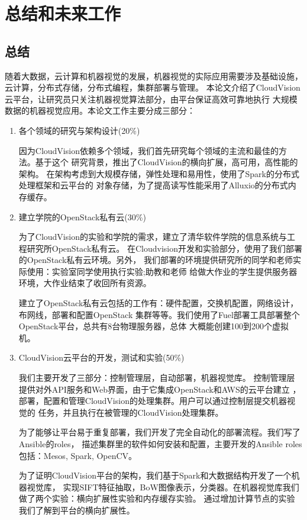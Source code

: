 \chapter{总结和未来工作}

\section{总结}
随着大数据，云计算和机器视觉的发展，机器视觉的实际应用需要涉及基础设施，云计算，分布式存储，分布式编程，集群部署与管理。
本论文介绍了CloudVision云平台，让研究员只关注机器视觉算法部分，由平台保证高效可靠地执行
大规模数据的机器视觉应用。本论文工作主要分成三部分：
\begin{enumerate}
  \item 各个领域的研究与架构设计(20\%)

        因为CloudVision依赖多个领域，我们首先研究每个领域的主流和最佳的方法。基于这个
        研究背景，推出了CloudVision的横向扩展，高可用，高性能的架构。
        在架构考虑到大规模存储，弹性处理和易用性，使用了Spark的分布式处理框架和云平台的
        对象存储，为了提高读写性能采用了Alluxio的分布式内存缓存。

  \item 建立学院的OpenStack私有云(30\%)

        为了CloudVision的实验和学院的需求，建立了清华软件学院的信息系统与工程研究所OpenStack私有云。
        在Cloudvision开发和实验部分，使用了我们部署的OpenStack私有云环境。另外，
        我们部署的环境提供研究所的同学和老师实际使用：实验室同学使用执行实验;助教和老师
        给做大作业的学生提供服务器环境，大作业结束了收回所有资源。
        
        建立了OpenStack私有云包括的工作有：硬件配置，交换机配置，网络设计，布网线，部署和配置OpenStack
        集群等等。我们使用了Fuel部署工具部署整个OpenStack平台，总共有8台物理服务器，总体
        大概能创建100到200个虚拟机。
  \item CloudVision云平台的开发，测试和实验(50\%)

        我们主要开发了三部分：控制管理层，自动部署，机器视觉库。
        控制管理层提供对外API服务和Web界面，由于它集成OpenStack和AWS的云平台建立
        ，部署，配置和管理CloudVision的处理集群。用户可以通过控制层提交机器视觉的
        任务，并且执行在被管理的CloudVision处理集群。

        为了能够让平台易于重复部署，我们开发了完全自动化的部署流程。我们写了Ansible的roles，
        描述集群里的软件如何安装和配置，主要开发的Ansible roles包括：Mesos, Spark, OpenCV。

        为了证明CloudVision平台的架构，我们基于Spark和大数据结构开发了一个机器视觉库，
        实现SIFT特征抽取，BoW图像表示，分类器。在机器视觉库我们做了两个实验：横向扩展性实验和内存缓存实验。
        通过增加计算节点的实验我们了解到平台的横向扩展性。

\end{enumerate}

